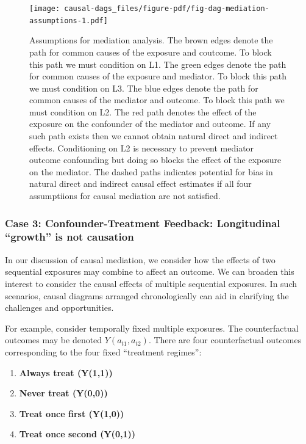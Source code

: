 \documentclass[
  singlecolumn]{article}
\begin{document}
\begin{figure}

{\centering \texttt{[image: causal-dags\_files/figure-pdf/fig-dag-mediation-assumptions-1.pdf]}

}

\caption{\label{fig-dag-mediation-assumptions}Assumptions for mediation
analysis. The brown edges denote the path for common causes of the
exposure and coutcome. To block this path we must condition on L1. The
green edges denote the path for common causes of the exposure and
mediator. To block this path we must condition on L3. The blue edges
denote the path for common causes of the mediator and outcome. To block
this path we must condition on L2. The red path denotes the effect of
the exposure on the confounder of the mediator and outcome. If any such
path exists then we cannot obtain natural direct and indirect effects.
Conditioning on L2 is necessary to prevent mediator outcome confounding
but doing so blocks the effect of the exposure on the mediator. The
dashed paths indicates potential for bias in natural direct and indirect
causal effect estimates if all four assumptiions for causal mediation
are not satisfied.}

\end{figure}

\hypertarget{case-3-confounder-treatment-feedback-longitudinal-growth-is-not-causation}{%
\subsubsection{Case 3: Confounder-Treatment Feedback: Longitudinal
``growth'' is not
causation}\label{case-3-confounder-treatment-feedback-longitudinal-growth-is-not-causation}}

In our discussion of causal mediation, we consider how the effects of
two sequential exposures may combine to affect an outcome. We can
broaden this interest to consider the causal effects of multiple
sequential exposures. In such scenarios, causal diagrams arranged
chronologically can aid in clarifying the challenges and opportunities.

For example, consider temporally fixed multiple exposures. The
counterfactual outcomes may be denoted \(Y(a_{t1} ,a_{t2})\). There are
four counterfactual outcomes corresponding to the four fixed ``treatment
regimes'':

\begin{enumerate}
\def\labelenumi{\arabic{enumi}.}
\item
  \textbf{Always treat (Y(1,1))}
\item
  \textbf{Never treat (Y(0,0))}
\item
  \textbf{Treat once first (Y(1,0))}
\item
  \textbf{Treat once second (Y(0,1))}
\end{enumerate}
\end{document}
